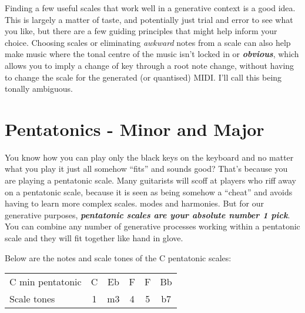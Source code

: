 \documentclass[
  12pt,
  letterpaper,
  oneside,
  open=any]{scrbook}
\begin{document}
\begin{tcolorbox}[enhanced jigsaw, titlerule=0mm, toprule=.15mm, bottomrule=.15mm, colframe=quarto-callout-tip-color-frame, bottomtitle=1mm, opacityback=0, breakable, leftrule=.75mm, coltitle=black, colback=white, rightrule=.15mm, arc=.35mm, toptitle=1mm, title=\textcolor{quarto-callout-tip-color}{\faLightbulb}\hspace{0.5em}{Key idea}, opacitybacktitle=0.6, left=2mm, colbacktitle=quarto-callout-tip-color!10!white]

Finding a few useful scales that work well in a generative context is a
good idea. This is largely a matter of taste, and potentially just trial
and error to see what you like, but there are a few guiding principles
that might help inform your choice. Choosing scales or eliminating
\emph{awkward} notes from a scale can also help make music where the
tonal centre of the music isn't locked in or \textbf{\emph{obvious}},
which allows you to imply a change of key through a root note change,
without having to change the scale for the generated (or quantised)
MIDI. I'll call this being tonally ambiguous.

\end{tcolorbox}

\section{Pentatonics - Minor and
Major}\label{pentatonics---minor-and-major}

You know how you can play only the black keys on the keyboard and no
matter what you play it just all somehow ``fits'' and sounds good?
That's because you are playing a pentatonic scale. Many guitarists will
scoff at players who riff away on a pentatonic scale, because it is seen
as being somehow a ``cheat'' and avoids having to learn more complex
scales. modes and harmonies. But for our generative purposes,
\textbf{\emph{pentatonic scales are your absolute number 1 pick}}. You
can combine any number of generative processes working within a
pentatonic scale and they will fit together like hand in glove.

Below are the notes and scale tones of the C pentatonic scales:

\begin{longtable}[]{@{}lccccc@{}}
\toprule\noalign{}
\endhead
\bottomrule\noalign{}
\endlastfoot
C min pentatonic & C & Eb & F & F & Bb \\
Scale tones & 1 & m3 & 4 & 5 & b7 \\
\end{longtable}
\end{document}
